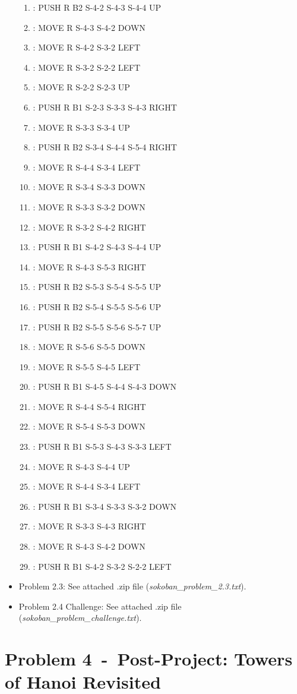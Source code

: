 \documentclass[12pt]{article}
\newcommand{\problem}[2]{\section*{Problem {#1}~-~{#2}}}
\begin{document}
\begin{appendix}
\begin{itemize}
\begin{enumerate}
	\item: PUSH R B2 S-4-2 S-4-3 S-4-4 UP
	\item: MOVE R S-4-3 S-4-2 DOWN
	\item: MOVE R S-4-2 S-3-2 LEFT
	\item: MOVE R S-3-2 S-2-2 LEFT
	\item: MOVE R S-2-2 S-2-3 UP
	\item: PUSH R B1 S-2-3 S-3-3 S-4-3 RIGHT
	\item: MOVE R S-3-3 S-3-4 UP
	\item: PUSH R B2 S-3-4 S-4-4 S-5-4 RIGHT
	\item: MOVE R S-4-4 S-3-4 LEFT
	\item: MOVE R S-3-4 S-3-3 DOWN
	\item: MOVE R S-3-3 S-3-2 DOWN
	\item: MOVE R S-3-2 S-4-2 RIGHT
	\item: PUSH R B1 S-4-2 S-4-3 S-4-4 UP
	\item: MOVE R S-4-3 S-5-3 RIGHT
	\item: PUSH R B2 S-5-3 S-5-4 S-5-5 UP
	\item: PUSH R B2 S-5-4 S-5-5 S-5-6 UP
	\item: PUSH R B2 S-5-5 S-5-6 S-5-7 UP
	\item: MOVE R S-5-6 S-5-5 DOWN
	\item: MOVE R S-5-5 S-4-5 LEFT
	\item: PUSH R B1 S-4-5 S-4-4 S-4-3 DOWN
	\item: MOVE R S-4-4 S-5-4 RIGHT
	\item: MOVE R S-5-4 S-5-3 DOWN
	\item: PUSH R B1 S-5-3 S-4-3 S-3-3 LEFT
	\item: MOVE R S-4-3 S-4-4 UP
	\item: MOVE R S-4-4 S-3-4 LEFT
	\item: PUSH R B1 S-3-4 S-3-3 S-3-2 DOWN
	\item: MOVE R S-3-3 S-4-3 RIGHT
	\item: MOVE R S-4-3 S-4-2 DOWN
	\item: PUSH R B1 S-4-2 S-3-2 S-2-2 LEFT
      \end{enumerate}
    \item Problem 2.3: See attached .zip file (\textit{sokoban\_problem\_2.3.txt}).
    \item Problem 2.4 Challenge: See attached .zip file (\textit{sokoban\_problem\_challenge.txt}).
  \end{itemize}
\problem{4}{Post-Project: Towers of Hanoi Revisited}

\end{appendix}
\end{document}
